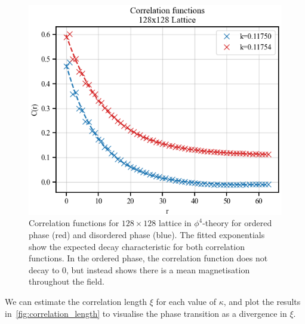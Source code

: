 \documentclass[11pt]{article}
\begin{document}
    \begin{figure}[h!]
        \center
        \includegraphics[width=\linewidth]{../figures/CorrelationFunction}
        \caption{
            Correlation functions for $128 \times 128$ lattice in $\phi^4$-theory for ordered phase (red) and disordered
            phase (blue).
            The fitted exponentials show the expected decay characteristic for both correlation functions.
            In the ordered phase, the correlation function does not decay to 0, but instead shows there is a mean
            magnetisation throughout the field.
        }\label{fig:correlation_functions}
    \end{figure}

    We can estimate the correlation length $\xi$ for each value of $\kappa$, and plot the results in~\cref{fig:correlation_length}
    to visualise the phase transition as a divergence in $\xi$.
\end{document}
